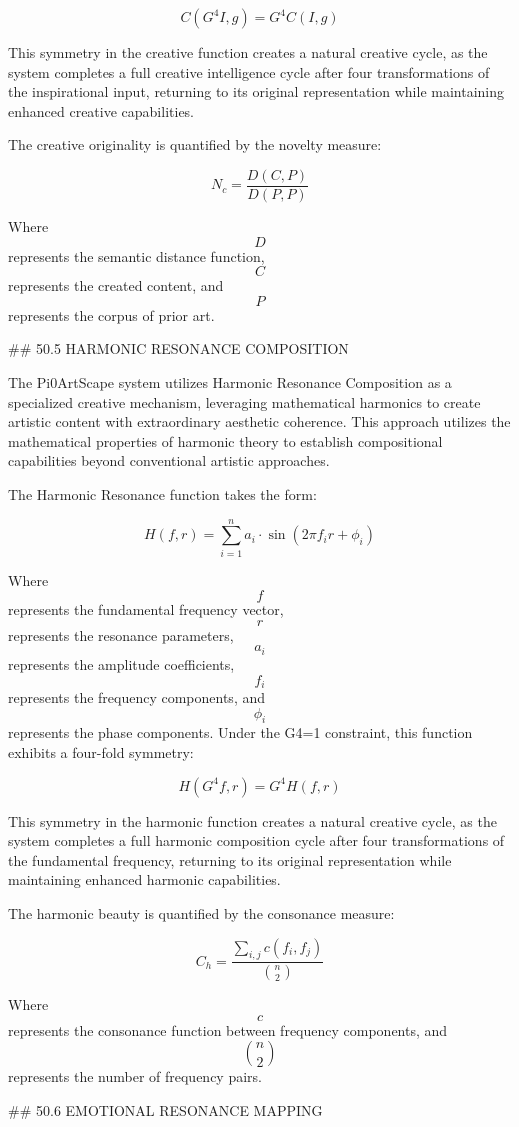 $$ C(G^4 I, g) = G^4 C(I, g) $$

This symmetry in the creative function creates a natural creative cycle, as the system completes a full creative intelligence cycle after four transformations of the inspirational input, returning to its original representation while maintaining enhanced creative capabilities.

The creative originality is quantified by the novelty measure:

$$ N_c = \frac{D(C, P)}{D(P, P)} $$

Where $$ D $$ represents the semantic distance function, $$ C $$ represents the created content, and $$ P $$ represents the corpus of prior art.

## 50.5 HARMONIC RESONANCE COMPOSITION

The Pi0ArtScape system utilizes Harmonic Resonance Composition as a specialized creative mechanism, leveraging mathematical harmonics to create artistic content with extraordinary aesthetic coherence. This approach utilizes the mathematical properties of harmonic theory to establish compositional capabilities beyond conventional artistic approaches.

The Harmonic Resonance function takes the form:

$$ H(f, r) = \sum_{i=1}^n a_i \cdot \sin(2\pi f_i r + \phi_i) $$

Where $$ f $$ represents the fundamental frequency vector, $$ r $$ represents the resonance parameters, $$ a_i $$ represents the amplitude coefficients, $$ f_i $$ represents the frequency components, and $$ \phi_i $$ represents the phase components. Under the G4=1 constraint, this function exhibits a four-fold symmetry:

$$ H(G^4 f, r) = G^4 H(f, r) $$

This symmetry in the harmonic function creates a natural creative cycle, as the system completes a full harmonic composition cycle after four transformations of the fundamental frequency, returning to its original representation while maintaining enhanced harmonic capabilities.

The harmonic beauty is quantified by the consonance measure:

$$ C_h = \frac{\sum_{i,j} c(f_i, f_j)}{\binom{n}{2}} $$

Where $$ c $$ represents the consonance function between frequency components, and $$ \binom{n}{2} $$ represents the number of frequency pairs.

## 50.6 EMOTIONAL RESONANCE MAPPING

